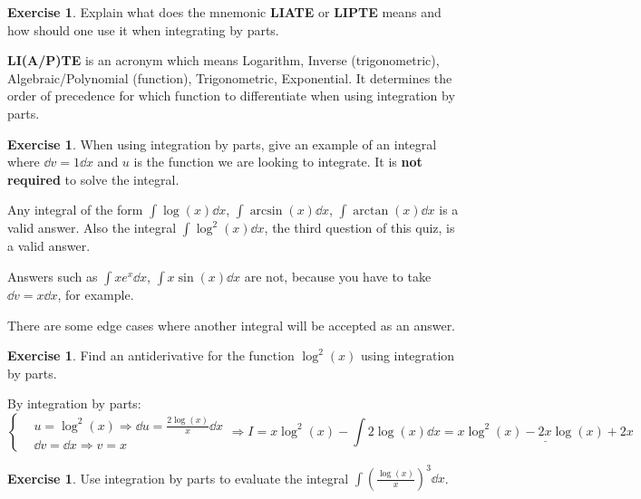 \documentclass[12pt]{article}
\theoremstyle{plain}
\theoremstyle{definition}
\newtheorem{Ej}[Th]{Exercise}         %
\theoremstyle{remark}
\renewcommand{\:}{\colon}           %
\newcommand{\un}[1]{\underline{#1}}
\renewcommand{\.}{\Cdot}                %
\newcommand{\To}{\Rightarrow}
\begin{document}

\begin{Ej}
  Explain what does the mnemonic \textbf{LIATE} or \textbf{LIPTE} means and how should one use it when integrating by parts.
\end{Ej}

\begin{ptcb}
  \textbf{LI(A/P)TE} is an acronym which means Logarithm, Inverse (trigonometric), Algebraic/Polynomial (function), Trigonometric, Exponential. It determines the order of precedence for which function to differentiate when using integration by parts.
  \end{ptcb}

  \begin{Ej}
    When using integration by parts, give an example of an integral where $\dd v=1\dd x$ and $u$ is the function we are looking to integrate. It is \textbf{not required} to solve the integral.
  \end{Ej}
  
  
  \begin{ptcb}
    Any integral of the form $\int\log(x)\dd x$, $\int\arcsin(x)\dd x$, $\int\arctan(x)\dd x$ is a valid answer. Also the integral $\int\log^2(x)\dd x$, the third question of this quiz, is a valid answer.\par 
    Answers such as $\int xe^x\dd x$, $\int x\sin(x)\dd x$ are not, because you have to take $\dd v=x\dd x$, for example.\par 
    There are some edge cases where another integral will be accepted as an answer.
    \end{ptcb}
  
    \begin{Ej}
Find an antiderivative for the function $\log^2(x)$ using integration by parts.
    \end{Ej}
    
    
    \begin{ptcb}
      By integration by parts:
      $$
      \left\lbrace
      \begin{aligned}
        &u=\log^2(x)\To\dd u=\frac{2\log(x)}{x}\dd x\\
        &\dd v=\dd x\To v=x
      \end{aligned}
      \right.
      \To I=x\log^2(x)-\int 2\log(x)\dd x=\un{x\log^2(x)-2x\log(x)+2x}
      $$
      \end{ptcb}
    
      
    \begin{Ej}
      Use integration by parts to evaluate the integral $\displaystyle\int\left(\frac{\log(x)}{x}\right)^3\dd x$.
          \end{Ej}
          
\end{document}
